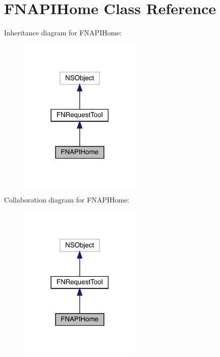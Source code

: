 \hypertarget{interface_f_n_a_p_i_home}{}\section{F\+N\+A\+P\+I\+Home Class Reference}
\label{interface_f_n_a_p_i_home}


Inheritance diagram for F\+N\+A\+P\+I\+Home\+:\nopagebreak
\begin{figure}[H]
\begin{center}
\leavevmode
\includegraphics[width=165pt]{interface_f_n_a_p_i_home__inherit__graph}
\end{center}
\end{figure}


Collaboration diagram for F\+N\+A\+P\+I\+Home\+:\nopagebreak
\begin{figure}[H]
\begin{center}
\leavevmode
\includegraphics[width=165pt]{interface_f_n_a_p_i_home__coll__graph}
\end{center}
\end{figure}
